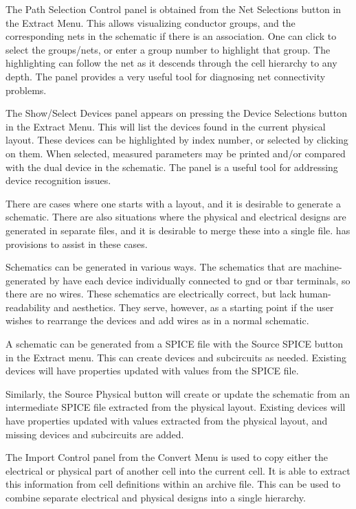 The {\cb Path Selection Control} panel is obtained from the {\cb Net
Selections} button in the {\cb Extract Menu}.  This allows visualizing
conductor groups, and the corresponding nets in the schematic if there
is an association.  One can click to select the groups/nets, or enter
a group number to highlight that group.  The highlighting can follow
the net as it descends through the cell hierarchy to any depth.  The
panel provides a very useful tool for diagnosing net connectivity
problems.

The {\cb Show/Select Devices} panel appears on pressing the {\cb
Device Selections} button in the {\cb Extract Menu}.  This will list
the devices found in the current physical layout.  These devices can
be highlighted by index number, or selected by clicking on them.  When
selected, measured parameters may be printed and/or compared with the
dual device in the schematic.  The panel is a useful tool for
addressing device recognition issues.

There are cases where one starts with a layout, and it is desirable to
generate a schematic.  There are also situations where the physical
and electrical designs are generated in separate files, and it is
desirable to merge these into a single file.  {\Xic} has provisions to
assist in these cases.

Schematics can be generated in various ways.  The schematics that are
machine-generated by {\Xic} have each device individually connected to
{\et gnd} or {\et tbar} terminals, so there are no wires.  These
schematics are electrically correct, but lack human-readability and
aesthetics.  They serve, however, as a starting point if the user
wishes to rearrange the devices and add wires as in a normal
schematic.

A schematic can be generated from a SPICE file with the {\cb Source
SPICE} button in the {\cb Extract menu}.  This can create devices and
subcircuits as needed.  Existing devices will have properties updated
with values from the SPICE file.

Similarly, the {\cb Source Physical} button will create or update the
schematic from an intermediate SPICE file extracted from the physical
layout.  Existing devices will have properties updated with values
extracted from the physical layout, and missing devices and
subcircuits are added.

The {\cb Import Control} panel from the {\cb Convert Menu} is used
to copy either the electrical or physical part of another cell into
the current cell.  It is able to extract this information from cell
definitions within an archive file.  This can be used to combine
separate electrical and physical designs into a single hierarchy.

